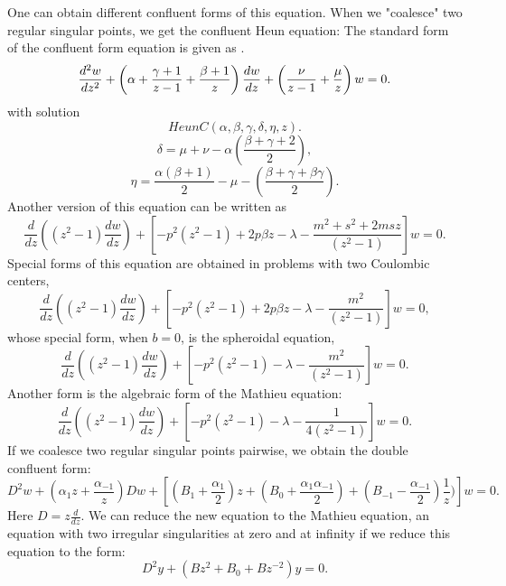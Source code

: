 \documentclass{article}
\begin{document}
\noindent One can obtain different confluent forms of this
equation. When we "coalesce" two regular singular points, we get
the confluent Heun equation: The standard form of the confluent
form equation is given as \cite{Fiziev}.
\begin{equation}
{\frac{{d^{2}w}}{{dz^{2}}}}+\left( \alpha +{\frac{{\gamma+1}}{{z-1}}}+{\frac{{\beta+1}}{{z}}}%
\right) {\frac{{dw}}{{dz}}}+\left( {\frac{{\nu}}{{z-1}}}+{\frac{{\mu}}{{%
z}}}\right)w =0 .
\end{equation}
with solution
$$ HeunC (\alpha, \beta, \gamma, \delta,\eta,z).
$$
$$\delta = \mu+\nu-\alpha ( \frac{{ \beta+\gamma+2}}{{2}} ),$$
$$ \eta = \frac{{ \alpha(\beta+1) }}{{2}} - \mu - (\frac {{ \beta+\gamma+ \beta \gamma}}{{2}}). $$
Another version of this equation can be written as
\begin{equation}
\frac {d}{dz} (( z^2 -1)\frac {dw}{dz}) + [ -p^2 ( z^2-1) +2p\beta
z- \lambda - \frac{m^2+s^2+2msz}{(z^2-1)}]w = 0 .
\end{equation}%
Special forms of this equation are obtained in problems with two
Coulombic centers,
\begin{equation}
\frac {d}{dz} (( z^2 -1)\frac {dw}{dz}) + [ -p^2 ( z^2-1) +2p\beta
z- \lambda - \frac{m^2}{(z^2-1)}]w = 0 ,
\end{equation}%
whose special form, when $b=0$, is the spheroidal equation,
\begin{equation}
\frac {d}{dz} (( z^2 -1)\frac {dw}{dz}) + [ -p^2 ( z^2-1) -
\lambda - \frac{m^2}{(z^2-1)}]w = 0 .
\end{equation}%
Another form is the algebraic form of the Mathieu equation:
\begin{equation}
\frac {d}{dz} (( z^2 -1)\frac {dw}{dz}) + [ -p^2 ( z^2-1) -
\lambda - \frac{1}{4(z^2-1)}]w = 0 .
\end{equation}%
If we coalesce two regular singular points pairwise, we obtain the
double confluent form:
\begin{equation}
D^2 w + ( \alpha_{1} z + \frac{\alpha_{-1}}{z} ) Dw +[(B_{1} +
\frac{\alpha_{1}}{2} )z +( B_0 + \frac{\alpha_{1} \alpha_{-1}}{2}
) + ( B_{-1} - \frac{\alpha_{-1}}{2}) \frac{1}{z}) ] w = 0 .
\end{equation}%
Here $ D = z \frac{d}{dz} $.  We can reduce the new equation to
the Mathieu equation, an equation with two irregular singularities
at zero and at infinity if we reduce this equation to the form:
\begin{equation}
D^2 y + ( B z^2 + B_0 + B z^{-2} ) y = 0.
\end {equation}
\end{document}
